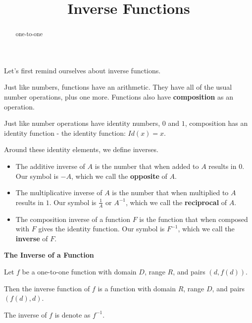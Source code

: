 \documentclass{ximera}
\title{Inverse Functions}
\begin{document}
\begin{abstract}
one-to-one
\end{abstract}
\maketitle


Let's first remind ourselves about inverse functions. 


Just like numbers, functions have an arithmetic.  They have all of the usual number operations, plus one more.  Functions also have \textbf{\textcolor{purple!85!blue}{composition}} as an operation.

Just like number operations have identity numbers, $0$ and $1$, composition has an identity function - the identity function: $Id(x) = x$.




Around these identity elements, we define inverses.






\begin{itemize}
\item The additive inverse of $A$ is the number that when added to $A$ results in $0$.  Our symbol is $-A$, which we call the \textbf{\textcolor{blue!55!black}{opposite}} of $A$.
\item The multiplicative inverse of $A$ is the number that when multiplied to $A$ results in $1$.  Our symbol is $\frac{1}{A}$ or $A^{-1}$, which we call the \textbf{\textcolor{blue!55!black}{reciprocal}} of $A$.
\item The composition inverse of a function $F$ is the function that when composed with $F$ gives the identity function. Our symbol is $F^{-1}$, which we call the \textbf{\textcolor{blue!55!black}{inverse}} of $F$.
\end{itemize}





\begin{definition} \textbf{\textcolor{green!50!black}{The Inverse of a Function}} 


Let $f$ be a one-to-one function with domain $D$, range $R$, and pairs $(d, f(d))$.

Then the inverse function of $f$ is a function with domain $R$, range $D$, and pairs $(f(d), d)$.


The inverse of $f$ is denote as $f^{-1}$.

\end{definition}
\end{document}

